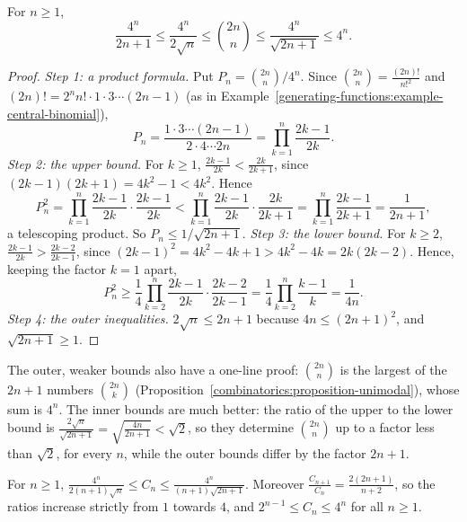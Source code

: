 \begin{proposition}\label{generating-functions:proposition-central-binomial-bounds}
For $n \geq 1$,
\[
\frac{4^n}{2n + 1} \leq \frac{4^n}{2\sqrt{n}} \leq \binom{2n}{n} \leq \frac{4^n}{\sqrt{2n + 1}} \leq 4^n.
\]
\end{proposition}

\begin{proof}
\emph{Step 1: a product formula.} Put $P_n = \binom{2n}{n}/4^n$. Since $\binom{2n}{n} = \frac{(2n)!}{n!^2}$ and $(2n)! = 2^nn! \cdot 1 \cdot 3 \cdots (2n - 1)$ (as in
Example~\ref{generating-functions:example-central-binomial}),
\[
P_n = \frac{1 \cdot 3 \cdots (2n - 1)}{2 \cdot 4 \cdots 2n} = \prod_{k=1}^{n}\frac{2k - 1}{2k}.
\]
\emph{Step 2: the upper bound.} For $k \geq 1$, $\frac{2k - 1}{2k} < \frac{2k}{2k + 1}$, since $(2k - 1)(2k + 1) = 4k^2 - 1 < 4k^2$. Hence
\[
P_n^2 = \prod_{k=1}^{n}\frac{2k - 1}{2k} \cdot \frac{2k - 1}{2k} < \prod_{k=1}^{n}\frac{2k - 1}{2k} \cdot \frac{2k}{2k + 1} = \prod_{k=1}^{n}\frac{2k - 1}{2k + 1} = \frac{1}{2n + 1},
\]
a telescoping product. So $P_n \leq 1/\sqrt{2n + 1}$.
\emph{Step 3: the lower bound.} For $k \geq 2$, $\frac{2k - 1}{2k} > \frac{2k - 2}{2k - 1}$, since $(2k - 1)^2 = 4k^2 - 4k + 1 > 4k^2 - 4k = 2k(2k - 2)$. Hence, keeping the factor $k = 1$ apart,
\[
P_n^2 \geq \frac14\prod_{k=2}^{n}\frac{2k - 1}{2k} \cdot \frac{2k - 2}{2k - 1} = \frac14\prod_{k=2}^{n}\frac{k - 1}{k} = \frac{1}{4n}.
\]
\emph{Step 4: the outer inequalities.} $2\sqrt{n} \leq 2n + 1$ because $4n \leq (2n + 1)^2$, and $\sqrt{2n + 1} \geq 1$.
\end{proof}

The outer, weaker bounds also have a one-line proof: $\binom{2n}{n}$ is the largest of the $2n + 1$ numbers $\binom{2n}{k}$ (Proposition~\ref{combinatorics:proposition-unimodal}), whose sum is
$4^n$. The inner bounds are much better: the ratio of the upper to the lower bound is $\frac{2\sqrt{n}}{\sqrt{2n + 1}} = \sqrt{\frac{4n}{2n + 1}} < \sqrt{2}$, so they determine $\binom{2n}{n}$ up to a
factor less than $\sqrt{2}$, for every $n$, while the outer bounds differ by the factor $2n + 1$.

\begin{corollary}\label{generating-functions:corollary-catalan-bounds}
For $n \geq 1$, $\displaystyle\frac{4^n}{2(n + 1)\sqrt{n}} \leq C_n \leq \frac{4^n}{(n + 1)\sqrt{2n + 1}}$. Moreover $\frac{C_{n+1}}{C_n} = \frac{2(2n + 1)}{n + 2}$, so the ratios increase strictly
from $1$ towards $4$, and $2^{n-1} \leq C_n \leq 4^n$ for all $n \geq 1$.
\end{corollary}

